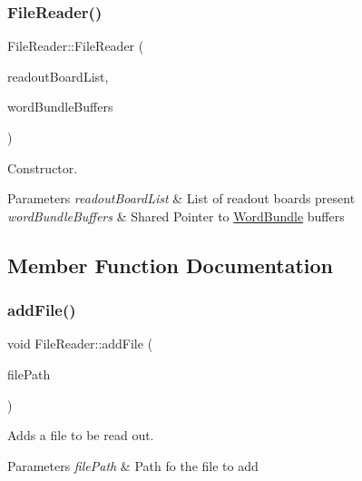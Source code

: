 \subsubsection{\texorpdfstring{File\+Reader()}{FileReader()}}
{\footnotesize\ttfamily File\+Reader\+::\+File\+Reader (\begin{DoxyParamCaption}\item[{const std\+::list$<$ unsigned int $>$ \&}]{readout\+Board\+List,  }\item[{std\+::array$<$ std\+::shared\+\_\+ptr$<$ \hyperlink{class_file_reader_ac755c1e271610c2c12a7fc5b55cc048b}{bundle\+Buffer} $>$, 4 $>$}]{word\+Bundle\+Buffers }\end{DoxyParamCaption})}



Constructor. 


\begin{DoxyParams}{Parameters}
{\em readout\+Board\+List} & List of readout boards present \\
\hline
{\em word\+Bundle\+Buffers} & Shared Pointer to \hyperlink{class_word_bundle}{Word\+Bundle} buffers \\
\hline
\end{DoxyParams}


\subsection{Member Function Documentation}
\mbox{\label{class_file_reader_a3404694daef538fdd001a3e2ae898fb8}} 
\subsubsection{\texorpdfstring{add\+File()}{addFile()}}
{\footnotesize\ttfamily void File\+Reader\+::add\+File (\begin{DoxyParamCaption}\item[{const std\+::string \&}]{file\+Path }\end{DoxyParamCaption})\hspace{0.3cm}{\ttfamily [private]}}



Adds a file to be read out. 


\begin{DoxyParams}{Parameters}
{\em file\+Path} & Path fo the file to add \\
\hline
\end{DoxyParams}
\mbox{\label{class_file_reader_a58b80f2c9c2ec8381527bdfca1008007}} 
